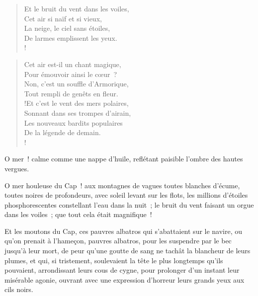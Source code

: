 \documentclass[french,twoside]{book} %
\newcommand{\astertri}{\medskip\par\centerline{\color{rubric}\large\selectfont{\syms ✻\,✻\,✻}}\medskip\par}%
\newenvironment{quoteblock}%
  {\begin{quoting}}
  {\end{quoting}}
\newenvironment{quotebar}{%
    \def\FrameCommand{{\color{rubric!10!}\vrule width 0.5em} \hspace{0.9em}}%
    \def\OuterFrameSep{\itemsep} %
    \MakeFramed {\advance\hsize-\width \FrameRestore}
  }%
  {%
    \endMakeFramed
  }
\renewenvironment{quoteblock}%
  {%
    \savenotes
    \setstretch{0.9}
    \normalfont
    \begin{quotebar}
  }
  {%
    \end{quotebar}
    \spewnotes
  }
\begin{document}
\begin{verse}
Et le bruit du vent dans les voiles,\\
Cet air si naïf et si vieux,\\
La neige, le ciel sans étoiles,\\
De larmes emplissent les yeux.\\!
\end{verse}
\begin{quoteblock}

\astertri

\end{quoteblock}

\begin{verse}
Cet air est-il un chant magique,\\
Pour émouvoir ainsi le cœur ?\\
Non, c’est un souffle d’Armorique,\\
Tout rempli de genêts en fleur.\\!Et c’est le vent des mers polaires,\\
Sonnant dans ses trompes d’airain,\\
Les nouveaux bardits populaires\\
De la légende de demain.\\!
\end{verse}

\noindent O mer ! calme comme une nappe d’huile, reflétant paisible l’ombre des hautes vergues.\par
O mer houleuse du Cap ! aux montagnes de vagues toutes blanches d’écume, toutes noires de profondeurs, avec soleil levant sur les flots, les millions d’étoiles phosphorescentes constellant l’eau dans la nuit ; le bruit du vent faisant un orgue dans les voiles ; que tout cela était magnifique !\par
Et les moutons du Cap, ces pauvres albatros qui s’abattaient sur le navire, ou qu’on prenait à l’hameçon, pauvres albatros, pour les suspendre par le bec jusqu’à leur mort, de peur qu’une goutte de sang ne tachât la blancheur de leurs  plumes, et qui, si tristement, soulevaient la tête le plus longtemps qu’ils pouvaient, arrondissant leurs cous de cygne, pour prolonger d’un instant leur misérable agonie, ouvrant avec une expression d’horreur leurs grands yeux aux cils noirs.\par
\end{document}
